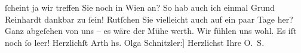 \begin{ledgroupsized}[t]{13cm}
               ſcheint ja wir treffen Sie noch in Wien an? So hab
               auch ich einmal Grund Reinhardt dankbar zu
               ſein! Rutſchen Sie vielleicht auch auf ein paar Tage her? {\pb}Ganz abgeſehen von uns – es wäre der Mühe werth. Wir
               fühlen uns wohl. Es iſt noch ſo leer!\pend
           \pstart Herzlichſt \spacefill\mbox{Arth}\pend{}\pstart
           \noindent{}{[}hs. Olga Schnitzler:{]} Herzlichst Ihre\pend
           \pstart \spacefill\mbox{O. S.}\pend{}
         
         \endnumbering{}\end{ledgroupsized}  \newcommand{\dateiname}{L02262}\newcommand{\titel}{Arthur und Olga Schnitzler an Richard Beer-Hofmann, 11. 6. 1917}\newcommand{\editorInnen}{Martin Anton Müller und Gerd-Hermann Susen}
      